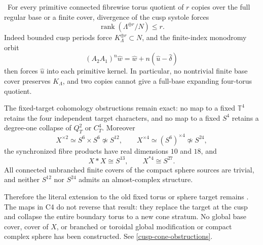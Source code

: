 \begin{auditrecord}
\Verified\ For every primitive connected fibrewise torus quotient of \(r\)
copies over the full regular base or a finite cover, divergence of the cusp
systole forces
\[
 \operatorname{rank}(\Lambda^{\oplus r}/N)\leq r.
\]
Indeed bounded cusp periods force \(K_\Lambda^{\oplus r}\subset N\), and
the finite-index monodromy orbit
\[
 (A_2A_1)^n\widehat w
 =\widehat w+n(\widehat u-\widehat\delta)
\]
then forces \(\widehat u\) into each primitive kernel.  In particular, no
nontrivial finite base cover preserves \(K_\Lambda\), and two copies cannot
give a full-base expanding four-torus quotient.

The fixed-target cohomology obstructions remain exact: no map to a fixed
\(\mathbb T^4\) retains the four independent target characters, and no map to a
fixed \(S^4\) retains a degree-one collapse of \(Q_T^2\) or \(C_T^4\).
Moreover
\[
 X^{\times2}\simeq S^6\times S^6\not\simeq S^{12},\qquad
 X^{\times4}\simeq(S^6)^{\times4}\not\simeq S^{24},
\]
the synchronized fibre products have real dimensions \(10\) and \(18\),
and
\[
 X*X\cong S^{13},\qquad X^{*4}\cong S^{27}.
\]
All connected unbranched finite covers of the compact sphere sources are
trivial, and neither \(S^{12}\) nor \(S^{24}\) admits an almost-complex
structure.

Therefore the literal extension to the old fixed torus or sphere target
remains \Refuted.  The maps in C4 do not reverse that result: they replace
the target at the cusp and collapse the entire boundary torus to a new cone
 stratum.  No global base cover, cover of \(X\), or branched or toroidal
 global modification
or compact complex sphere has been constructed.  See
\cref{cusp-cone-obstructions}.
\end{auditrecord}

